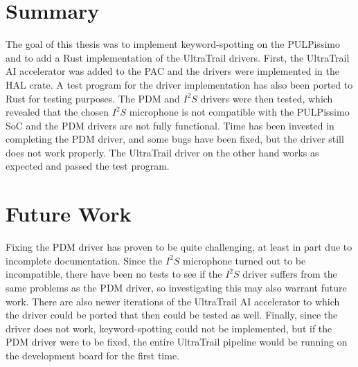 
\section{Summary}

The goal of this thesis was to implement keyword-spotting on the PULPissimo and to add a Rust implementation of the UltraTrail drivers.
First, the UltraTrail AI accelerator was added to the PAC and the drivers were implemented in the HAL crate.
A test program for the driver implementation has also been ported to Rust for testing purposes.
The PDM and $I^2S$ drivers were then tested, which revealed that the chosen $I^2S$
microphone is not compatible with the PULPissimo SoC and the PDM drivers are not fully functional.
Time has been invested in completing the PDM driver, and some bugs have been fixed, but the driver still does not work properly.
The UltraTrail driver on the other hand works as expected and passed the test program.

\section{Future Work}

Fixing the PDM driver has proven to be quite challenging, at least in part due to incomplete documentation.
Since the $I^2S$ microphone turned out to be incompatible, there have been no tests to see if the $I^2S$
driver suffers from the same problems as the PDM driver, so investigating this may also warrant future work.
There are also newer iterations of the UltraTrail AI accelerator to which the driver could be ported
that then could be tested as well.
Finally, since the driver does not work, keyword-spotting could not be implemented,
but if the PDM driver were to be fixed, the entire UltraTrail pipeline would be running on the development board for the first time.

